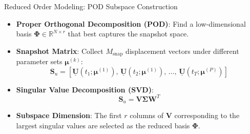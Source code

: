 \documentclass[aspectratio=169, 10pt]{beamer}
\newcommand{\mat}[1]{\mathbf{#1}}
\begin{document}
\begin{frame}{Reduced Order Modeling: POD Subspace Construction}
    \begin{itemize}
        \item \textbf{Proper Orthogonal Decomposition (POD)}: Find a low-dimensional basis $\boldsymbol{\Phi} \in \mathbb{R}^{N \times r}$ that best captures the snapshot space.
        \item \textbf{Snapshot Matrix}: Collect $M_{\text{snap}}$ displacement vectors under different parameter sets $\boldsymbol{\mu}^{(k)}$:
        \begin{equation*}
            \mat{S}_u = \left[ \underline{\mathbf{U}}(t_1; \boldsymbol{\mu}^{(1)}), \, \underline{\mathbf{U}}(t_2; \boldsymbol{\mu}^{(1)}), \, \dots, \, \underline{\mathbf{U}}(t_T; \boldsymbol{\mu}^{(P)}) \right]
        \end{equation*}
        \item \textbf{Singular Value Decomposition (SVD)}:
        \begin{equation*}
            \mat{S}_u = \mat{V} \boldsymbol{\Sigma} \mat{W}^T
        \end{equation*}
        \item \textbf{Subspace Dimension}: The first $r$ columns of $\mat{V}$ corresponding to the largest singular values are selected as the reduced basis $\boldsymbol{\Phi}$.
    \end{itemize}
\end{frame}
\end{document}
